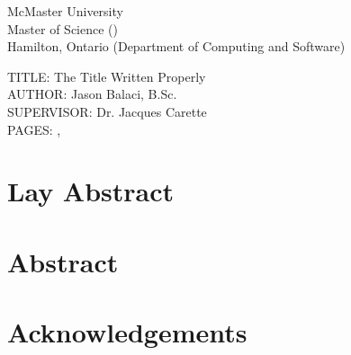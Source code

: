 \documentclass[12pt,oneside]{book}
\begin{document}
\noindent
McMaster University \\
Master of Science (\the\year{}) \\
Hamilton, Ontario (Department of Computing and Software)

\vspace{2cm}

\noindent
TITLE: The Title Written Properly \\
AUTHOR: Jason Balaci, B.Sc. \\
SUPERVISOR: Dr. Jacques Carette \\
PAGES: \pageref{lastOfFrontMatter}, \pageref{LastPage}

\newpage


\chapter*{Lay Abstract}



\chapter{Abstract}



\chapter{Acknowledgements}



\tableofcontents

\end{document}
